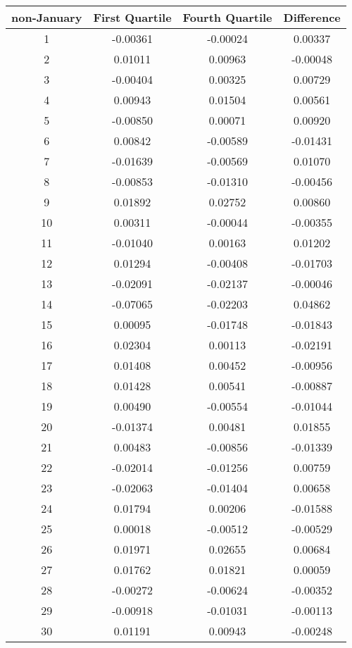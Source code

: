 \documentclass[11pt]{article}
\begin{document}
\begin{longtable}{cccc}

  \hline
 non-January& First Quartile & Fourth Quartile & Difference \\ 
  \hline
1 & -0.00361 & -0.00024 & 0.00337 \\ 
  2 & 0.01011 & 0.00963 & -0.00048 \\ 
  3 & -0.00404 & 0.00325 & 0.00729 \\ 
  4 & 0.00943 & 0.01504 & 0.00561 \\ 
  5 & -0.00850 & 0.00071 & 0.00920 \\ 
  6 & 0.00842 & -0.00589 & -0.01431 \\ 
  7 & -0.01639 & -0.00569 & 0.01070 \\ 
  8 & -0.00853 & -0.01310 & -0.00456 \\ 
  9 & 0.01892 & 0.02752 & 0.00860 \\ 
  10 & 0.00311 & -0.00044 & -0.00355 \\ 
  11 & -0.01040 & 0.00163 & 0.01202 \\ 
  12 & 0.01294 & -0.00408 & -0.01703 \\ 
  13 & -0.02091 & -0.02137 & -0.00046 \\ 
  14 & -0.07065 & -0.02203 & 0.04862 \\ 
  15 & 0.00095 & -0.01748 & -0.01843 \\ 
  16 & 0.02304 & 0.00113 & -0.02191 \\ 
  17 & 0.01408 & 0.00452 & -0.00956 \\ 
  18 & 0.01428 & 0.00541 & -0.00887 \\ 
  19 & 0.00490 & -0.00554 & -0.01044 \\ 
  20 & -0.01374 & 0.00481 & 0.01855 \\ 
  21 & 0.00483 & -0.00856 & -0.01339 \\ 
  22 & -0.02014 & -0.01256 & 0.00759 \\ 
  23 & -0.02063 & -0.01404 & 0.00658 \\ 
  24 & 0.01794 & 0.00206 & -0.01588 \\ 
  25 & 0.00018 & -0.00512 & -0.00529 \\ 
  26 & 0.01971 & 0.02655 & 0.00684 \\ 
  27 & 0.01762 & 0.01821 & 0.00059 \\ 
  28 & -0.00272 & -0.00624 & -0.00352 \\ 
  29 & -0.00918 & -0.01031 & -0.00113 \\ 
  30 & 0.01191 & 0.00943 & -0.00248 \\ 

\end{longtable}
\end{document}

